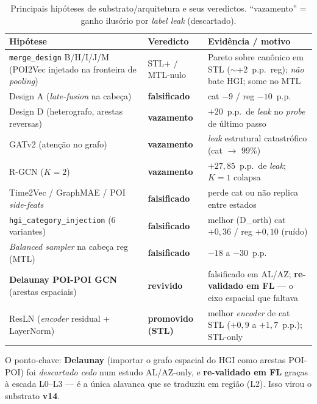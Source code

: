 \documentclass[11pt,a4paper]{article}
\newcommand{\good}[1]{\textcolor{green!45!black}{\textbf{#1}}}
\newcommand{\bad}[1]{\textcolor{red!60!black}{\textbf{#1}}}
\begin{document}
\begin{table}[H]
\centering
\footnotesize
\caption{Principais hipóteses de substrato/arquitetura e seus veredictos. ``vazamento'' = ganho
ilusório por \textit{label leak} (descartado).}
\renewcommand{\arraystretch}{1.1}
\begin{tabular}{p{5.2cm}p{2.3cm}p{6.3cm}}
\toprule
\textbf{Hipótese} & \textbf{Veredicto} & \textbf{Evidência / motivo} \\
\midrule
\texttt{merge\_design} B/H/I/J/M (POI2Vec injetado na fronteira de \textit{pooling}) & STL+ / MTL-nulo & Pareto sobre canônico em STL ($\sim$+2~p.p.\ reg); \emph{não} bate HGI; some no MTL \\
Design A (\textit{late-fusion} na cabeça) & \bad{falsificado} & cat $-9$ / reg $-10$~p.p. \\
Design D (heterografo, arestas reversas) & \bad{vazamento} & $+20$~p.p.\ de \textit{leak} no \textit{probe} de último passo \\
GATv2 (atenção no grafo) & \bad{vazamento} & \textit{leak} estrutural catastrófico (cat $\to$ 99\%) \\
R-GCN ($K{=}2$) & \bad{vazamento} & $+27{,}85$~p.p.\ de \textit{leak}; $K{=}1$ colapsa \\
Time2Vec / GraphMAE / POI \textit{side-feats} & \bad{falsificado} & perde cat ou não replica entre estados \\
\texttt{hgi\_category\_injection} (6 variantes) & \bad{falsificado} & melhor (D\_orth) cat $+0{,}36$ / reg $+0{,}10$ (ruído) \\
\textit{Balanced sampler} na cabeça reg (MTL) & \bad{falsificado} & $-18$ a $-30$~p.p. \\
\textbf{Delaunay POI-POI GCN} (arestas espaciais) & \good{revivido} & falsificado em AL/AZ; \textbf{re-validado em FL} --- o eixo espacial que faltava \\
ResLN (\textit{encoder} residual + LayerNorm) & \good{promovido (STL)} & melhor \textit{encoder} de cat STL ($+0{,}9$ a $+1{,}7$~p.p.); STL-only \\
\bottomrule
\end{tabular}
\end{table}

\noindent O ponto-chave: \textbf{Delaunay} (importar o grafo espacial do HGI como arestas POI-POI) foi
\emph{descartado cedo} num estudo AL/AZ-only, e \textbf{re-validado em FL} graças à escada L0--L3 ---
é a única alavanca que se traduziu em região (L2). Isso virou o substrato \textbf{v14}.
\end{document}
